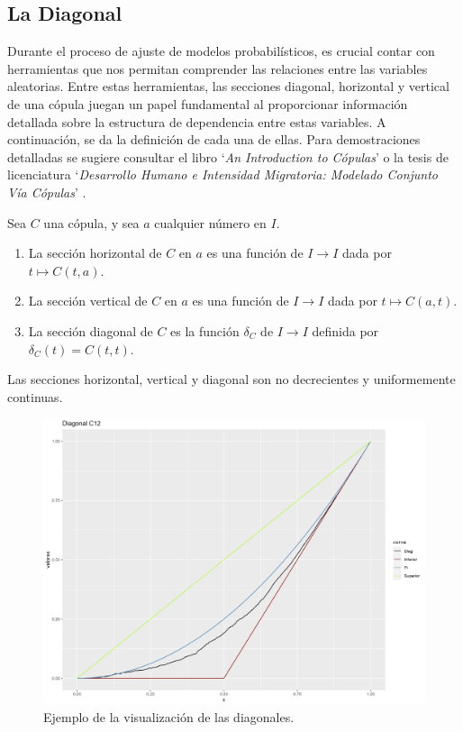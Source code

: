 
\subsection{La Diagonal}

Durante el proceso de ajuste de modelos probabilísticos, es crucial contar con herramientas que nos permitan comprender las relaciones entre las variables aleatorias. Entre estas herramientas, las secciones diagonal, horizontal y vertical de una cópula juegan un papel fundamental al proporcionar información detallada sobre la estructura de dependencia entre estas variables. A continuación, se da la definición de cada una de ellas. Para demostraciones detalladas se sugiere consultar el libro `\textit{An Introduction to Cópulas}' \cite{nelsenintroduction} o la tesis de licenciatura `\textit{Desarrollo Humano e Intensidad Migratoria: Modelado Conjunto Vía Cópulas}' \cite{TesisEmanuel}.

\begin{defn}
    Sea $C$ una cópula, y sea $a$ cualquier número en $I$. 
    \begin{enumerate}
        \item La sección horizontal de $C$ en $a$ es una función de $I \to I$ dada por $ t \mapsto C(t, a)$. 
        \item La sección vertical de $C$ en $a$ es una función de $I \to I$ dada por $ t \mapsto C(a, t)$.
        \item La sección diagonal de $C$ es la función $\delta_C$ de $I \to I$ definida por $\delta_C(t) = C(t,t)$.
    \end{enumerate}
\end{defn}

\begin{corl}
    Las secciones horizontal, vertical y diagonal son no decrecientes y uniformemente continuas.
\end{corl}

\begin{figure}[H]
    \centering
    \includegraphics[width =  0.5 \textwidth]{4img/DiagMujC12.png}
    \caption{Ejemplo de la visualización de las diagonales.}
    \label{fig:diagEj}
\end{figure}


